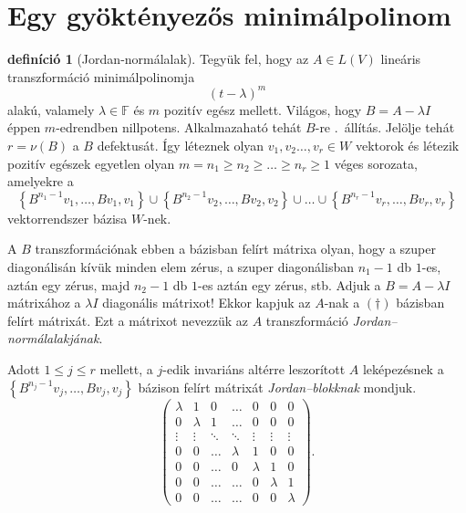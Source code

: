 \documentclass[9pt, a4paper, showtrims]{memoir}
\theoremstyle{plain}
\theoremstyle{remark}
\theoremstyle{definition}
\newtheorem{definition}[proposition]{definíció}
\begin{document}
\section{Egy gyöktényezős minimálpolinom}
\begin{definition}[Jordan-normálalak]
        Tegyük fel, hogy az $A\in L\left( V \right)$ lineáris transzformáció
        minimálpolinomja 
        \[
            \left( t-\lambda \right)^m
        \]
        alakú, valamely $\lambda\in\mathbb{F}$ és $m$ pozitív egész mellett.
        Világos, hogy $B=A-\lambda I$ éppen $m$-edrendben nillpotens.
        Alkalmazaható tehát $B$-re .~állítás.
        Jelölje tehát $r=\nu\left( B \right)$ a $B$ defektusát.
        Így léteznek olyan $v_1,v_2\dots,v_r\in W$ vektorok és 
        létezik pozitív egészek egyetlen olyan $m=n_1\geq n_2\geq \dots\geq n_r\geq 1$ véges sorozata,
        amelyekre a
        \[
            \left\{ B^{n_1-1}v_1,\dots,Bv_1,v_1 \right\}
            \cup
            \left\{ B^{n_2-1}v_2,\dots,Bv_2,v_2 \right\}
            \cup
            \ldots
            \cup
            \left\{ B^{n_r-1}v_r,\dots,Bv_r,v_r \right\}
            \tag{\dag}
        \]
        vektorrendszer bázisa $W$-nek. 

        A $B$ transzformációnak ebben a bázisban felírt mátrixa olyan, hogy
        a szuper diagonálisán kívük minden elem zérus,
        a szuper diagonálisban $n_1-1$ db $1$-es, aztán egy zérus, majd $n_2-1$ db $1$-es aztán egy zérus, stb.
        Adjuk a $B=A-\lambda I$ mátrixához a $\lambda I$ diagonális mátrixot!
        Ekkor kapjuk az $A$-nak a $(\dag)$ bázisban felírt mátrixát.
        Ezt a mátrixot nevezzük az $A$ transzformáció \emph{Jordan--normálalakjának}.
\end{definition}
Adott $1\leq j\leq r$ mellett, 
a $j$-edik invariáns altérre leszorított $A$ leképezésnek a 
\begin{math}
    \left\{ B^{n_j-1}v_j,\dots,Bv_j,v_j \right\}
\end{math}
bázison felírt mátrixát \emph{Jordan--blokknak} mondjuk.
\[
    \begin{pmatrix}
        \lambda&1&0&\dots& 0 &0&0\\
        0&\lambda&1&\dots& 0 &0&0\\
        \vdots&\vdots&\ddots&\ddots&\vdots&\vdots&\vdots\\
        0&0&\dots&\lambda& 1 &0&0\\
        0&0&\dots&0& \lambda&1&0\\
        0&0&\dots&\dots& 0 &\lambda&1\\
        0&0&\dots&\dots& 0 &0&\lambda
    \end{pmatrix}.
\]
\end{document}
